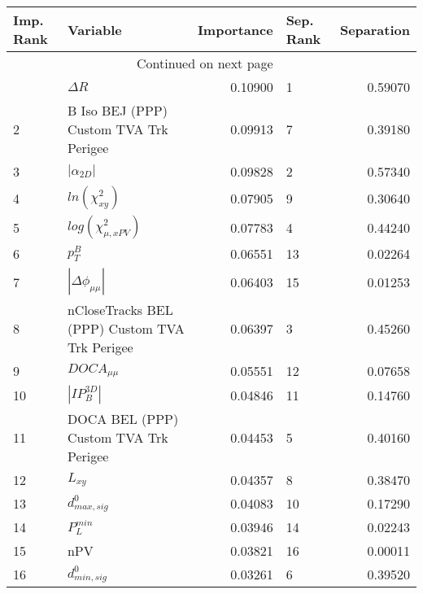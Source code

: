 \usepackage{lscape}

\begin{landscape}
\begin{longtable}{llrlr}
\toprule
Imp. Rank &                                       Variable &  Importance & Sep. Rank &  Separation \\
\midrule
\endhead
\midrule
\multicolumn{3}{r}{{Continued on next page}} \\
\midrule
\endfoot

\bottomrule
\endlastfoot
        1 &                                     $\Delta R$ &     0.10900 &         1 &     0.59070 \\
        2 &         B Iso BEJ (PPP) Custom TVA Trk Perigee &     0.09913 &         7 &     0.39180 \\
        3 &                                $|\alpha_{2D}|$ &     0.09828 &         2 &     0.57340 \\
        4 &                            $ln(\chi^{2}_{xy})$ &     0.07905 &         9 &     0.30640 \\
        5 &                      $log(\chi^{2}_{\mu,xPV})$ &     0.07783 &         4 &     0.44240 \\
        6 &                                      $p^B_{T}$ &     0.06551 &        13 &     0.02264 \\
        7 &                       $|\Delta \phi_{\mu\mu}|$ &     0.06403 &        15 &     0.01253 \\
        8 &  nCloseTracks BEL (PPP) Custom TVA Trk Perigee &     0.06397 &         3 &     0.45260 \\
        9 &                                $DOCA_{\mu\mu}$ &     0.05551 &        12 &     0.07658 \\
       10 &                                $|IP_{B}^{3D}|$ &     0.04846 &        11 &     0.14760 \\
       11 &          DOCA BEL (PPP) Custom TVA Trk Perigee &     0.04453 &         5 &     0.40160 \\
       12 &                                       $L_{xy}$ &     0.04357 &         8 &     0.38470 \\
       13 &                               $d^0_{max, sig}$ &     0.04083 &        10 &     0.17290 \\
       14 &                                  $P^{min}_{L}$ &     0.03946 &        14 &     0.02243 \\
       15 &                                            nPV &     0.03821 &        16 &     0.00011 \\
       16 &                               $d^0_{min, sig}$ &     0.03261 &         6 &     0.39520 \\
\end{longtable}

\end{landscape}
